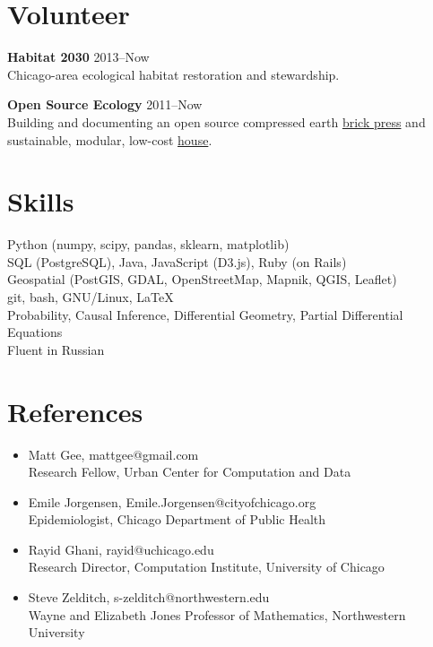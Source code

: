 \documentclass[margin,line]{resume}
\begin{document}
\begin{resume}
	\section{\mysidestyle Volunteer} 
	{\bf Habitat 2030} \hfill {2013--Now} \\
	Chicago-area ecological habitat restoration and stewardship.

	{\bf Open Source Ecology} \hfill {2011--Now} \\
	Building and documenting an open source compressed earth \href{http://opensourceecology.org/portfolio/ceb-press/}{brick press} and \\ sustainable, modular, low-cost \href{http://opensourceecology.org/portfolio/microhouse/}{house}.

    \section{\mysidestyle Skills}
		Python (numpy, scipy, pandas, sklearn, matplotlib) \\
                SQL (PostgreSQL), Java, JavaScript (D3.js), Ruby (on Rails)\\
                Geospatial (PostGIS, GDAL, OpenStreetMap, Mapnik, QGIS, Leaflet)\\
                git, bash, GNU/Linux, \LaTeX\\
		Probability, Causal Inference, Differential Geometry, Partial Differential Equations\\
                Fluent in Russian
	\section{\mysidestyle References}
		\begin{itemize}
	\item Matt Gee, mattgee@gmail.com \\
		Research Fellow, Urban Center for Computation and Data 
	\item Emile Jorgensen, Emile.Jorgensen@cityofchicago.org \\
		Epidemiologist, Chicago Department of Public Health
	\item Rayid Ghani, rayid@uchicago.edu \\
		Research Director, Computation Institute, University of Chicago 
	\item Steve Zelditch, s-zelditch@northwestern.edu \\
		Wayne and Elizabeth Jones Professor of Mathematics, Northwestern University 
		\end{itemize}
\end{resume}
\end{document}
